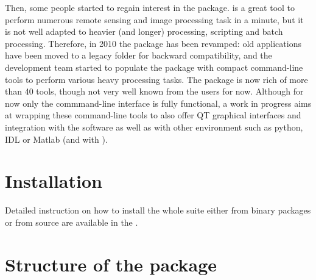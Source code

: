 Then, some people started to regain interest in the \app package. \mon
is a great tool to perform numerous remote sensing and image
processing task in a minute, but it is not well adapted to heavier
(and longer) processing, scripting and batch processing. Therefore, in
2010 the \app package has been revamped: old applications have been
moved to a legacy folder for backward compatibility, and the
development team started to populate the package with compact
command-line tools to perform various heavy processing tasks. The
package is now rich of more than 40 tools, though not very well known
from the users for now. Although for now only the commmand-line
interface is fully functional, a work in progress aims at wrapping these
command-line tools to also offer QT graphical interfaces and integration
with the \qgis software as well as with other environment such as python,
IDL or Matlab (and with \mont).

\section{Installation}\label{sec:appinstall}

Detailed instruction on how to install the whole \otb suite either
from binary packages or from source are available in the \sg.


\section{Structure of the package}\label{sec:appstruct}

